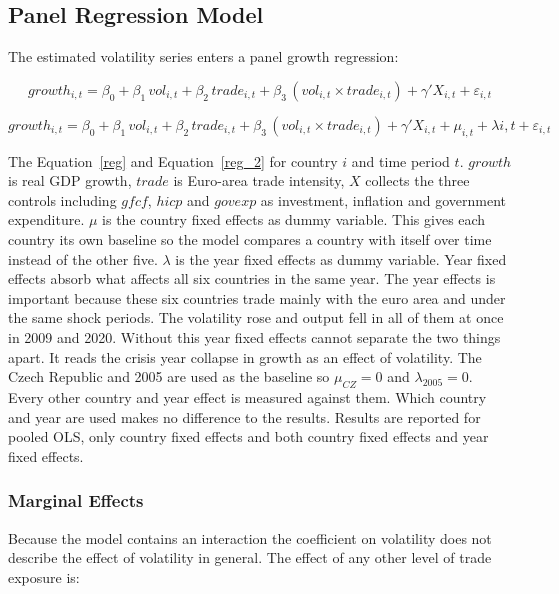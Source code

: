 \newpage
\subsection{Panel Regression Model}\label{subsec:reg_model}
The estimated volatility series enters a panel growth regression:

\begin{equation}\label{reg}
growth_{i,t} = \beta_0 + \beta_1\,vol_{i,t} + \beta_2\,trade_{i,t} + \beta_3\,(vol_{i,t} \times trade_{i,t}) + \gamma'X_{i,t} + \varepsilon_{i,t}
\end{equation}

\begin{equation}\label{reg_2}
growth_{i,t} = \beta_0 + \beta_1\,vol_{i,t} + \beta_2\,trade_{i,t} + \beta_3\,(vol_{i,t} \times trade_{i,t}) + \gamma'X_{i,t} + \mu_{i,t} + \lambda{i,t} + \varepsilon_{i,t}
\end{equation}

The Equation~\ref{reg} and Equation~\ref{reg_2} for country $i$ and time period $t$.
$growth$ is real GDP growth, $trade$ is Euro-area trade intensity, $X$ collects the three controls including $gfcf$, $hicp$ and $govexp$ as investment, inflation and government expenditure.
$\mu$ is the country fixed effects as dummy variable.
This gives each country its own baseline so the model compares a country with itself over time instead of the other five.
$\lambda$ is the year fixed effects as dummy variable.
Year fixed effects absorb what affects all six countries in the same year.
The year effects is important because these six countries trade mainly with the euro area and under the same shock periods.
The volatility rose and output fell in all of them at once in 2009 and 2020.
Without this year fixed effects cannot separate the two things apart.
It reads the crisis year collapse in growth as an effect of volatility.
The Czech Republic and 2005 are used as the baseline so $\mu_{CZ} = 0$ and $\lambda_{2005} = 0$.
Every other country and year effect is measured against them.
Which country and year are used makes no difference to the results.
Results are reported for pooled OLS, only country fixed effects and both country fixed effects and year fixed effects.

\subsubsection{Marginal Effects}\label{marg_ef2}

Because the model contains an interaction the coefficient on volatility does not describe the effect of volatility in general.
The effect of any other level of trade exposure is:

